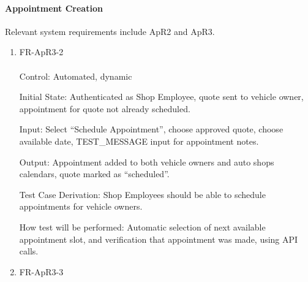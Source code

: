 \documentclass[12pt, titlepage]{article}
\begin{document}
    \paragraph{Appointment Creation} Relevant system requirements include ApR2 and ApR3.
        \begin{enumerate}
            \item{FR-ApR3-2} \\ \\
                Control: Automated, dynamic \par
                Initial State: Authenticated as Shop Employee, quote sent to vehicle owner, appointment for quote not already scheduled. \par
                Input: Select ``Schedule Appointment'', choose approved quote, choose available date, TEST\_MESSAGE input for appointment notes. \par
                Output: Appointment added to both vehicle owners and auto shops calendars, quote marked as ``scheduled''. \par
                Test Case Derivation: Shop Employees should be able to schedule appointments for vehicle owners. \par
                How test will be performed: Automatic selection of next available appointment slot, and verification that appointment was made, using API calls. 
            \item{FR-ApR3-3} \\ \\

\end{enumerate}
\end{document}

